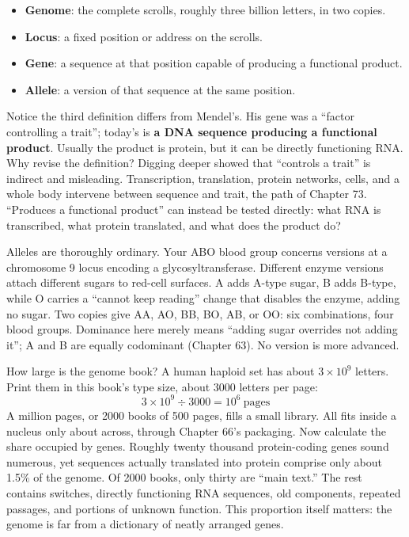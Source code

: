 \begin{itemize}[itemsep=2pt]
\item \textbf{Genome}: the complete scrolls, roughly three billion letters, in two copies.
\item \textbf{Locus}: a fixed position or address on the scrolls.
\item \textbf{Gene}: a sequence at that position capable of producing a functional product.
\item \textbf{Allele}: a version of that sequence at the same position.
\end{itemize}

Notice the third definition differs from Mendel's. His gene was a ``factor controlling a trait''; today's is \textbf{a DNA sequence producing a functional product}. Usually the product is protein, but it can be directly functioning RNA. Why revise the definition? Digging deeper showed that ``controls a trait'' is indirect and misleading. Transcription, translation, protein networks, cells, and a whole body intervene between sequence and trait, the path of Chapter 73. ``Produces a functional product'' can instead be tested directly: what RNA is transcribed, what protein translated, and what does the product do?

Alleles are thoroughly ordinary. Your ABO blood group concerns versions at a chromosome 9 locus encoding a glycosyltransferase. Different enzyme versions attach different sugars to red-cell surfaces. A adds A-type sugar, B adds B-type, while O carries a ``cannot keep reading'' change that disables the enzyme, adding no sugar. Two copies give AA, AO, BB, BO, AB, or OO: six combinations, four blood groups. Dominance here merely means ``adding sugar overrides not adding it''; A and B are equally codominant (Chapter 63). No version is more advanced.

\begin{qiaoliang}
How large is the genome book? A human haploid set has about $3\times 10^{9}$ letters. Print them in this book's type size, about 3000 letters per page:
\[3\times 10^{9} \div 3000 = 10^{6}\ \text{pages}\]
A million pages, or 2000 books of 500 pages, fills a small library. All fits inside a nucleus only about  across, through Chapter 66's packaging.
Now calculate the share occupied by genes. Roughly twenty thousand protein-coding genes sound numerous, yet sequences actually translated into protein comprise only about 1.5\% of the genome. Of 2000 books, only thirty are ``main text.'' The rest contains switches, directly functioning RNA sequences, old components, repeated passages, and portions of unknown function. This proportion itself matters: the genome is far from a dictionary of neatly arranged genes.
\end{qiaoliang}

